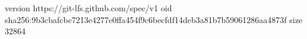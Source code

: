 version https://git-lfs.github.com/spec/v1
oid sha256:9b3cbafcbc7213e4277e0ffa454f9c6becfdf14deb3a81b7b59061286aa4873f
size 32864
